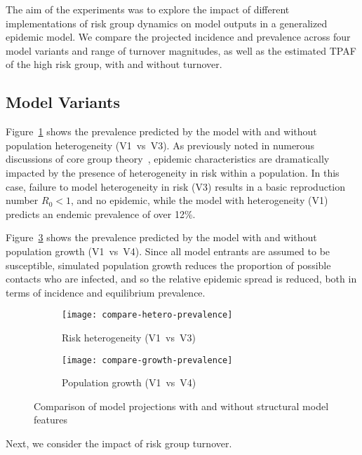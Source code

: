 The aim of the experiments was to explore the impact of
different implementations of risk group dynamics on model outputs
in a generalized epidemic model.
We compare the projected incidence and prevalence across
four model variants and range of turnover magnitudes,
as well as the estimated TPAF of the high risk group, with and without turnover.
\subsection{Model Variants}\label{ss:res-variants}
Figure~\ref{fig:compare-hetero-prevalence} shows the prevalence predicted by the model
with and without population heterogeneity (V1~vs~V3).
As previously noted in numerous discussions of core group theory~\citep{Yorke1978,Stigum1994},
epidemic characteristics are dramatically impacted by the presence of
heterogeneity in risk within a population.
In this case, failure to model heterogeneity in risk (V3) results in
a basic reproduction number $R_0 < 1$, and no epidemic,
while the model with heterogeneity (V1) predicts an endemic prevalence of over 12\%.
\par
Figure~\ref{fig:compare-growth-prevalence} shows the prevalence predicted by the model
with and without population growth (V1~vs~V4).
Since all model entrants are assumed to be susceptible,
simulated population growth reduces the proportion of possible contacts who are infected,
and so the relative epidemic spread is reduced,
both in terms of incidence and equilibrium prevalence.
\par
\begin{figure}
  \centering
  \begin{subfigure}{0.49\linewidth}
    \centering
    \texttt{[image: compare-hetero-prevalence]}
    \caption{Risk heterogeneity (V1~vs~V3)}
    \label{fig:compare-hetero-prevalence}
  \end{subfigure}
  \begin{subfigure}{0.49\linewidth}
    \centering
    \texttt{[image: compare-growth-prevalence]}
    \caption{Population growth (V1~vs~V4)}
    \label{fig:compare-growth-prevalence}
  \end{subfigure}
  \caption{Comparison of model projections with and without structural model features}
\end{figure}
\par
Next, we consider the impact of risk group turnover.
